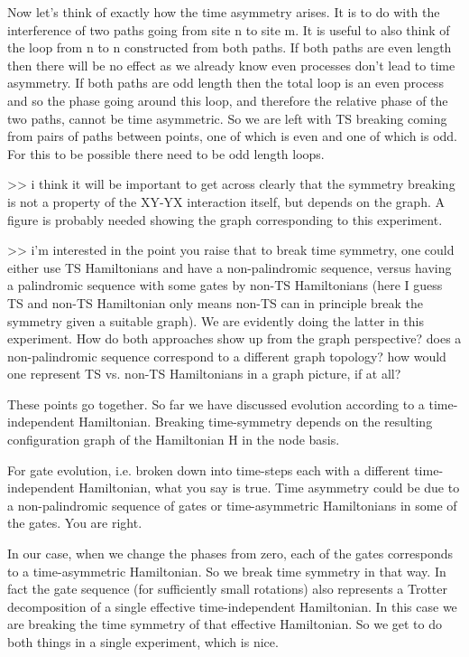 \documentclass[aps,pra,12pt,nofootinbib,superscriptaddress,longbibliography,showpacs]{revtex4-1}
\theoremstyle{plain}
\theoremstyle{definition}
\begin{document}
Now let's think of exactly how the time asymmetry arises. It is to do with the interference of two paths going from site n to site m. It is useful to also think of the loop from n to n constructed from both paths. If both paths are even length then there will be no effect as we already know even processes don't lead to time asymmetry. If both paths are odd length then the total loop is an even process and so the phase going around this loop, and therefore the relative phase of the two paths, cannot be time asymmetric. So we are left with TS breaking coming from pairs of paths between points, one of which is even and one of which is odd. For this to be possible there need to be odd length loops.

>> i think it will be important to get across clearly that the symmetry breaking is not a property of the XY-YX interaction itself, but depends on the graph. A figure is probably needed showing the graph corresponding to this experiment. 

>> i'm interested in the point you raise that to break time symmetry, one could either use TS Hamiltonians and have a non-palindromic sequence, versus having a palindromic sequence with some gates by non-TS Hamiltonians (here I guess TS and non-TS Hamiltonian only means non-TS can in principle break the symmetry given a suitable graph).  We are evidently doing the latter in this experiment. How do both approaches show up from the graph perspective? does a non-palindromic sequence correspond to a different graph topology? how would one represent TS vs. non-TS Hamiltonians in a graph picture, if at all? 

These points go together. So far we have discussed evolution according to a time-independent Hamiltonian. Breaking time-symmetry depends on the resulting configuration graph of the Hamiltonian H in the node basis. 

For gate evolution, i.e. broken down into time-steps each with a different time-independent Hamiltonian, what you say is true. Time asymmetry could be due to a non-palindromic sequence of gates or time-asymmetric Hamiltonians in some of the gates. You are right.

In our case, when we change the phases from zero, each of the gates corresponds to a time-asymmetric Hamiltonian. So we break time symmetry in that way. In fact the gate sequence (for sufficiently small rotations) also represents a Trotter decomposition of a single effective time-independent Hamiltonian. In this case we are breaking the time symmetry of that effective Hamiltonian. So we get to do both things in a single experiment, which is nice.
\end{document}
